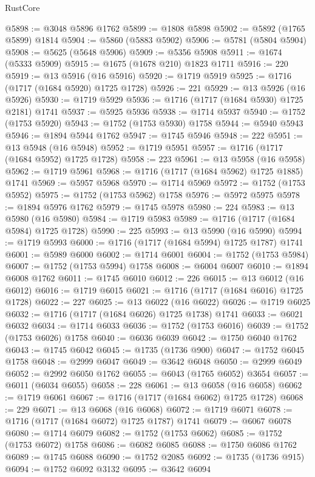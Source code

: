 \begin{lexlean}{RustCore}
\begin{coremodule}
@5898 := @3048 @5896 @1762
@5899 := @1808 @5898
@5902 := @5892 (@1765 @5899) @1814
@5904 := @5860 (@5883 @5902)
@5906 := @5781 (@5804 @5904)
@5908 := @5625 (@5648 @5906)
@5909 := @5356 @5908
@5911 := @1674 (@5333 @5909)
@5915 := @1675 (@1678 @210) @1823 @1711
@5916 := 220
@5919 := @13 @5916 (@16 @5916)
@5920 := @1719 @5919
@5925 := @1716 (@1717 (@1684 @5920) @1725 @1728)
@5926 := 221
@5929 := @13 @5926 (@16 @5926)
@5930 := @1719 @5929
@5936 := @1716 (@1717 (@1684 @5930) @1725 @2181) @1741
@5937 := @5925 @5936
@5938 := @1714 @5937
@5940 := @1752 (@1753 @5920)
@5943 := @1752 (@1753 @5930) @1758
@5944 := @5940 @5943
@5946 := @1894 @5944 @1762
@5947 := @1745 @5946
@5948 := 222
@5951 := @13 @5948 (@16 @5948)
@5952 := @1719 @5951
@5957 := @1716 (@1717 (@1684 @5952) @1725 @1728)
@5958 := 223
@5961 := @13 @5958 (@16 @5958)
@5962 := @1719 @5961
@5968 := @1716 (@1717 (@1684 @5962) @1725 @1885) @1741
@5969 := @5957 @5968
@5970 := @1714 @5969
@5972 := @1752 (@1753 @5952)
@5975 := @1752 (@1753 @5962) @1758
@5976 := @5972 @5975
@5978 := @1894 @5976 @1762
@5979 := @1745 @5978
@5980 := 224
@5983 := @13 @5980 (@16 @5980)
@5984 := @1719 @5983
@5989 := @1716 (@1717 (@1684 @5984) @1725 @1728)
@5990 := 225
@5993 := @13 @5990 (@16 @5990)
@5994 := @1719 @5993
@6000 := @1716 (@1717 (@1684 @5994) @1725 @1787) @1741
@6001 := @5989 @6000
@6002 := @1714 @6001
@6004 := @1752 (@1753 @5984)
@6007 := @1752 (@1753 @5994) @1758
@6008 := @6004 @6007
@6010 := @1894 @6008 @1762
@6011 := @1745 @6010
@6012 := 226
@6015 := @13 @6012 (@16 @6012)
@6016 := @1719 @6015
@6021 := @1716 (@1717 (@1684 @6016) @1725 @1728)
@6022 := 227
@6025 := @13 @6022 (@16 @6022)
@6026 := @1719 @6025
@6032 := @1716 (@1717 (@1684 @6026) @1725 @1738) @1741
@6033 := @6021 @6032
@6034 := @1714 @6033
@6036 := @1752 (@1753 @6016)
@6039 := @1752 (@1753 @6026) @1758
@6040 := @6036 @6039
@6042 := @1750 @6040 @1762
@6043 := @1745 @6042
@6045 := @1735 (@1736 @900)
@6047 := @1752 @6045 @1758
@6048 := @2999 @6047
@6049 := @3642 @6048
@6050 := @2999 @6049
@6052 := @2992 @6050 @1762
@6055 := @6043 (@1765 @6052) @3654
@6057 := @6011 (@6034 @6055)
@6058 := 228
@6061 := @13 @6058 (@16 @6058)
@6062 := @1719 @6061
@6067 := @1716 (@1717 (@1684 @6062) @1725 @1728)
@6068 := 229
@6071 := @13 @6068 (@16 @6068)
@6072 := @1719 @6071
@6078 := @1716 (@1717 (@1684 @6072) @1725 @1787) @1741
@6079 := @6067 @6078
@6080 := @1714 @6079
@6082 := @1752 (@1753 @6062)
@6085 := @1752 (@1753 @6072) @1758
@6086 := @6082 @6085
@6088 := @1750 @6086 @1762
@6089 := @1745 @6088
@6090 := @1752 @2085
@6092 := @1735 (@1736 @915)
@6094 := @1752 @6092 @3132
@6095 := @3642 @6094

\end{coremodule}
\end{lexlean}
